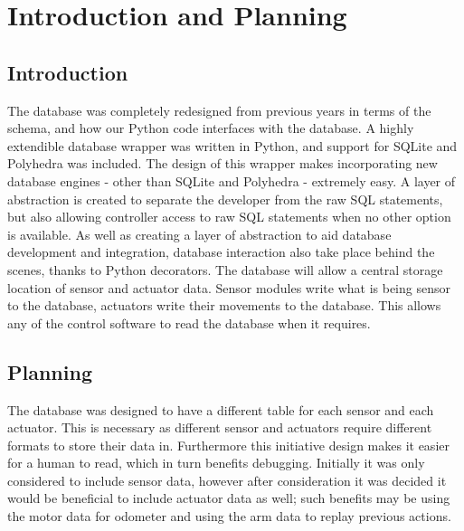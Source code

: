 \section{Introduction and Planning}
\subsection{Introduction}
The database was completely redesigned from previous years in terms of the schema, and how our Python code interfaces with the database.
A highly extendible database wrapper was written in Python, and support for SQLite and Polyhedra was included. The design of this wrapper makes incorporating new database engines - other than SQLite and Polyhedra - extremely easy.
\newline
A layer of abstraction is created to separate the developer from the raw SQL statements, but also allowing controller access to raw SQL statements when no other option is available.
As well as creating a layer of abstraction to aid database development and integration, database interaction also take place behind the scenes, thanks to Python decorators.
\newline
The database will allow a central storage location of sensor and actuator data. Sensor modules write what is being sensor to the database, actuators write their movements to the database. This allows any of the control software to read the database when it requires. 

\subsection{Planning}
The database was designed to have a different table for each sensor and each actuator. This is necessary as different sensor and actuators require different formats to store their data in. Furthermore this initiative design makes it easier for a human to read, which in turn benefits debugging. 
\newline
Initially it was only considered to include sensor data, however after consideration it was decided it would be beneficial to include actuator data as well; such benefits may be using the motor data for odometer and using the arm data to replay previous actions.



